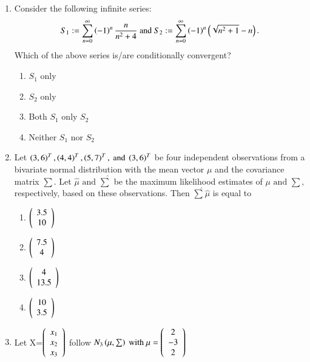 \documentclass[journal]{IEEEtran}
\begin{document}
\begin{enumerate} [start=27]
\begin{enumerate}
\end{enumerate}
\bigskip
\item Consider the following infinite series:
\begin{align*}
    S_{1}:=\sum_{n=0}^{\infty}\left(-1\right)^{n}\frac{n}{n^{2}+4} \text{ and } S_{2}:=\sum_{n=0}^{\infty}\left(-1\right)^{n}\left(\sqrt{n^{2}+1}-n\right). 
\end{align*}
Which of the above series is/are conditionally convergent?
\begin{enumerate}
    \item $S_{1}$ only
    \item $S_{2}$ only
    \item Both $S_{1} \text{ only } S_{2}$ 
    \item Neither  $S_{1} \text{ nor } S_{2}$ 
\end{enumerate}
\bigskip
\item Let $\left(3,6\right)^{T},\left(4,4\right)^{T},\left(5,7\right)^{T},\text{ and }\left(3,6\right)^{T}$ be four independent observations from a
bivariate normal distribution with the mean vector $\mu$ and the covariance matrix $\sum.$ Let $\hat{\mu} \text{ and } \hat{\sum}$ be the maximum likelihood estimates of $\mu \text{ and } \sum,$ respectively, based on
these observations. Then $\hat{\sum}\hat{\mu}$ is equal to
\begin{enumerate}
    \item $\left(\begin{array}{c} 3.5 \\ 10 \end{array}\right)$
    \item $\left(\begin{array}{c} 7.5 \\ 4 \end{array}\right)$
    \item $\left(\begin{array}{c} 4 \\ 13.5\end{array}\right)$
    \item $\left(\begin{array}{c} 10 \\ 3.5\end{array}\right)$
\end{enumerate}
\bigskip
\item Let X=$\left(\begin{array}{c} x_{1} \\ x_{2}\\x_{3} \end{array}\right)$  follow $N_{3}\left(\mu,\sum\right)\text{ with }\mu=\left(\begin{array}{c} 2 \\ -3 \\ 2 \end{array}\right)$

\end{enumerate}
\end{document}
